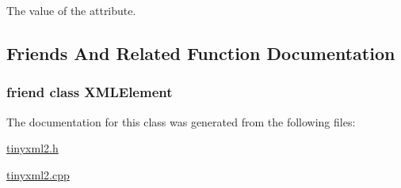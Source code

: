 The value of the attribute. 



\subsection{Friends And Related Function Documentation}
\hypertarget{classtinyxml2_1_1_x_m_l_attribute_ac2fba9b6e452829dd892f7392c24e0eb}{}
\subsubsection[{X\+M\+L\+Element}]{\setlength{\rightskip}{0pt plus 5cm}friend class {\bf X\+M\+L\+Element}\hspace{0.3cm}{\ttfamily [friend]}}\label{classtinyxml2_1_1_x_m_l_attribute_ac2fba9b6e452829dd892f7392c24e0eb}


The documentation for this class was generated from the following files\+:\begin{DoxyCompactItemize}
\item 
\hyperlink{tinyxml2_8h}{tinyxml2.\+h}\item 
\hyperlink{tinyxml2_8cpp}{tinyxml2.\+cpp}\end{DoxyCompactItemize}
